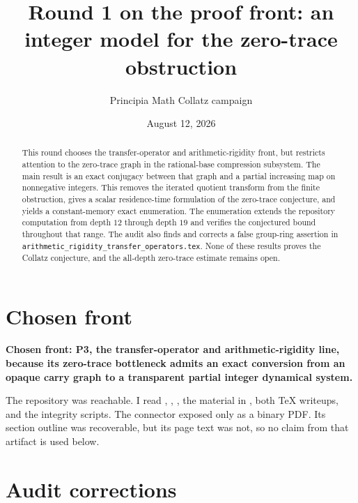 \documentclass[11pt]{article}
\title{Round 1 on the proof front: an integer model for the zero-trace obstruction}
\author{Principia Math Collatz campaign}
\date{August 12, 2026}
\theoremstyle{definition}
\theoremstyle{remark}
\begin{document}
\maketitle

\begin{abstract}
This round chooses the transfer-operator and arithmetic-rigidity front, but restricts attention to the zero-trace graph in the rational-base compression subsystem. The main result is an exact conjugacy between that graph and a partial increasing map on nonnegative integers. This removes the iterated quotient transform from the finite obstruction, gives a scalar residence-time formulation of the zero-trace conjecture, and yields a constant-memory exact enumeration. The enumeration extends the repository computation from depth $12$ through depth $19$ and verifies the conjectured bound throughout that range. The audit also finds and corrects a false group-ring assertion in \texttt{arithmetic\_rigidity\_transfer\_operators.tex}. None of these results proves the Collatz conjecture, and the all-depth zero-trace estimate remains open.
\end{abstract}

\section{Chosen front}

\textbf{Chosen front: P3, the transfer-operator and arithmetic-rigidity line, because its zero-trace bottleneck admits an exact conversion from an opaque carry graph to a transparent partial integer dynamical system.}

The repository was reachable. I read , , , the material in , both TeX writeups, and the integrity scripts. The connector exposed  only as a binary PDF. Its section outline was recoverable, but its page text was not, so no claim from that artifact is used below.

\section{Audit corrections}
\end{document}

